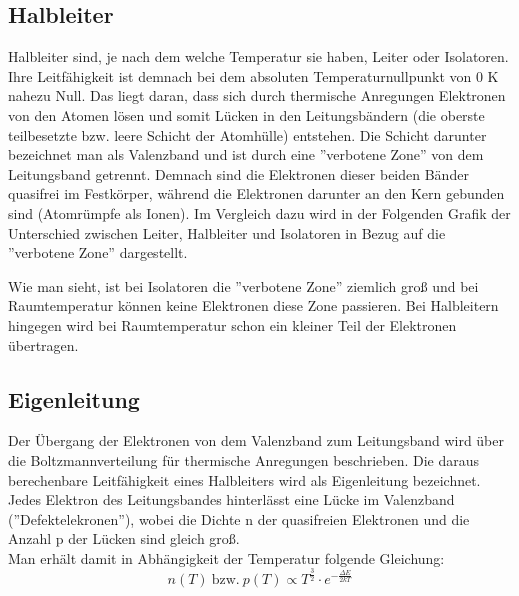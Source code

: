 \documentclass{article}
\begin{document}
\subsection{Halbleiter}
Halbleiter sind, je nach dem welche Temperatur sie haben, Leiter oder Isolatoren. Ihre Leitfähigkeit ist demnach bei dem absoluten Temperaturnullpunkt von 0 K nahezu Null. Das liegt daran, dass sich durch thermische Anregungen Elektronen von den Atomen lösen und somit Lücken in den Leitungsbändern (die oberste teilbesetzte bzw. leere Schicht der Atomhülle) entstehen. Die Schicht darunter bezeichnet man als Valenzband und ist durch eine ''verbotene Zone'' von dem Leitungsband getrennt. Demnach sind die Elektronen dieser beiden Bänder quasifrei im Festkörper, während die Elektronen darunter an den Kern gebunden sind (Atomrümpfe als Ionen). Im Vergleich dazu wird in der Folgenden Grafik der Unterschied zwischen Leiter, Halbleiter und Isolatoren in Bezug auf die ''verbotene Zone'' dargestellt.
\begin{center}
\begin{minipage}{\linewidth}
\centering
{}
%
\label{halbleiter}
\end{minipage}
\end{center}

Wie man sieht, ist bei Isolatoren die ''verbotene Zone'' ziemlich groß und bei Raumtemperatur können keine Elektronen diese Zone passieren. Bei Halbleitern hingegen wird bei Raumtemperatur schon ein kleiner Teil der Elektronen übertragen.

\subsection{Eigenleitung}
Der Übergang der Elektronen von dem Valenzband zum Leitungsband wird über die Boltzmannverteilung für thermische Anregungen beschrieben. Die daraus berechenbare Leitfähigkeit eines Halbleiters wird als Eigenleitung bezeichnet. Jedes Elektron des Leitungsbandes hinterlässt eine Lücke im Valenzband (''Defektelekronen''), wobei die Dichte n der quasifreien Elektronen und die Anzahl p der Lücken sind gleich groß.\\
Man erhält damit in Abhängigkeit der Temperatur folgende Gleichung:
\begin{equation}
n(T)\ \text{bzw.}\ p(T) \propto T^{\frac{3}{2}}\cdot e^{-\frac{\Delta E}{2kT}}
\end{equation}
\end{document}
